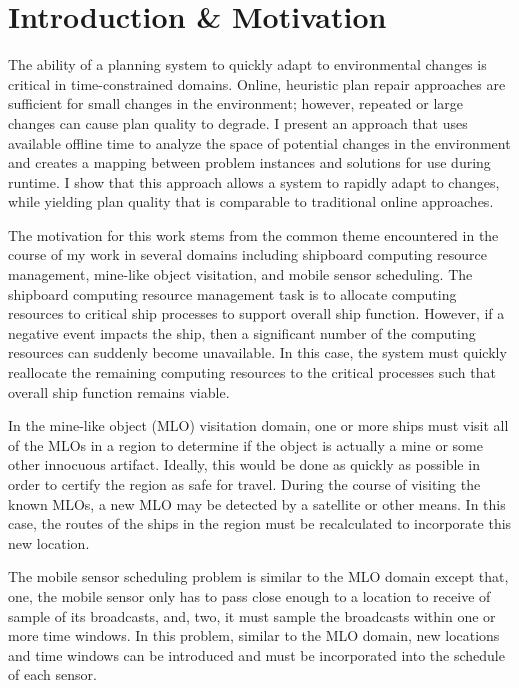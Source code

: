 \chapter{Introduction \& Motivation}
\thispagestyle{plain}

\label{ch:introduction}

The ability of a planning system to quickly adapt to environmental changes is critical in time-constrained domains.  Online, heuristic plan repair approaches are sufficient for small changes in the environment; however, repeated or large changes can cause plan quality to degrade. I present an approach that uses available offline time to analyze the space of potential changes in the environment and creates a mapping between problem instances and solutions for use during runtime.  I show that this approach allows a system to rapidly adapt to changes, while yielding plan quality that is comparable to traditional online approaches.


The motivation for this work stems from the common theme encountered in the course of my work in several domains including shipboard computing resource management, mine-like object visitation, and mobile sensor scheduling.  The shipboard computing resource management task is to allocate computing resources to critical ship processes to support overall ship function. However, if a negative event impacts the ship, then a significant number of the computing resources can suddenly become unavailable.  In this case, the system must quickly reallocate the remaining computing resources to the critical processes such that overall ship function remains viable.

In the mine-like object (MLO) visitation domain, one or more ships must visit all of the MLOs in a region to determine if the object is actually a mine or some other innocuous artifact.  Ideally, this would be done as quickly as possible in order to certify the region as safe for travel.  During the course of visiting the known MLOs, a new MLO may be detected by a satellite or other means.  In this case, the routes of the ships in the region must be recalculated to incorporate this new location.

The mobile sensor scheduling problem is similar to the MLO domain except that, one, the mobile sensor only has to pass close enough to a location to receive of sample of its broadcasts, and, two, it must sample the broadcasts within one or more time windows.  In this problem, similar to the MLO domain, new locations and time windows can be introduced and must be incorporated into the schedule of each sensor.

